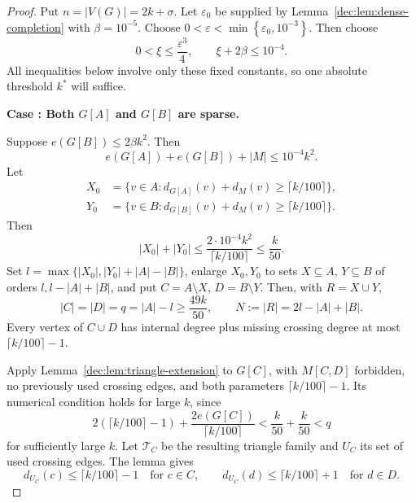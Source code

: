 \documentclass[11pt]{article}
\numberwithin{equation}{section}
\theoremstyle{remark}
\newcommand{\e}{\varepsilon}
\newcounter{proofcase}
\newcommand{\proofcase}[2]{
  \refstepcounter{proofcase}
  \par\medskip
  \noindent\textbf{Case \theproofcase: #2.}
  \label{#1}
  \par\smallskip
}
\begin{document}
\begin{proof}
\setcounter{proofcase}{0}
Put \(n=|V(G)|=2k+\sigma\).
Let \(\e_0\) be supplied by Lemma~\ref{dec:lem:dense-completion} with \(\beta=10^{-5}\).
Choose \(0<\e<\min\left\{\e_0, 10^{-3}\right\}\). Then choose
\begin{equation}\label{dec:eq:3.38}
  0<\xi\le\frac{\e^3}{4},
  \qquad \xi+2\beta\le10^{-4}.
\end{equation}
All inequalities below involve only these fixed constants, so one absolute threshold \(k^\ast\) will suffice.
\proofcase{dec:case:both-sparse}
  {Both \(G[A]\) and \(G[B]\) are sparse}
Suppose \(e(G[B])\le2\beta k^2\).  Then
\begin{equation*}
  e(G[A])+e(G[B])+|M|\le10^{-4}k^2.
\end{equation*}
Let 
\begin{equation*}
  \begin{aligned}
    X_0&=\{v\in A:d_{G[A]}(v)+d_M(v)\ge \lceil k/100\rceil\},\\
    Y_0&=\{v\in B:d_{G[B]}(v)+d_M(v)\ge \lceil k/100\rceil\}.
  \end{aligned}
\end{equation*}
Then
\begin{equation*}
 |X_0|+|Y_0|\le\frac{2\cdot10^{-4}k^2}{\lceil k/100\rceil}\le\frac k{50}.
\end{equation*}
Set \(l=\max\{|X_0|,|Y_0|+|A|-|B|\}\), enlarge \(X_0,Y_0\) to sets
\(X\subseteq A\), \(Y\subseteq B\) of orders \(l,l-|A|+|B|\), and put
\(C=A\setminus X\), \(D=B\setminus Y\).  Then, with \(R=X\cup Y\),
\begin{equation*}
 |C|=|D|=q=|A|-l\ge\frac{49k}{50},\qquad
 N:=|R|=2l-|A|+|B|.
\end{equation*}
Every vertex of \(C\cup D\) has internal degree plus missing crossing degree at most \(\lceil k/100\rceil-1\).

Apply Lemma~\ref{dec:lem:triangle-extension} to \(G[C]\), with \(M[C,D]\) forbidden,
no previously used crossing edges, and both parameters \(\lceil k/100\rceil-1\).
Its numerical condition holds for large \(k\), since
\begin{equation*}
 2(\lceil k/100\rceil-1)+\frac{2e(G[C])}{\lceil k/100\rceil}
 <\frac k{50}+\frac k{50}<q
\end{equation*}
for sufficiently large \(k\). Let \(\mathcal T_C\) be the resulting triangle family and \(U_C\) its set
of used crossing edges. The lemma gives
\begin{equation}\label{dec:eq:3.41}
 d_{U_C}(c)\le \lceil k/100\rceil-1\quad \text{for\ }c\in C,\qquad
 d_{U_C}(d)\le \lceil k/100\rceil+1\quad \text{for\ }d\in D.
\end{equation}


\end{proof}
\end{document}

